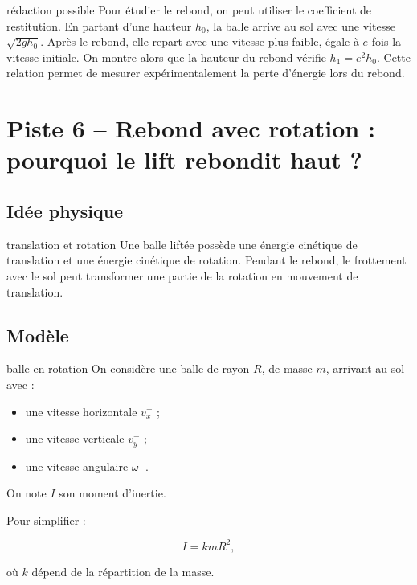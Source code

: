 \documentclass[11pt,a4paper]{article}
\begin{document}
\begin{oral}{rédaction possible}
Pour étudier le rebond, on peut utiliser le coefficient de restitution. En partant d'une hauteur $h_0$, la balle arrive au sol avec une vitesse $\sqrt{2gh_0}$. Après le rebond, elle repart avec une vitesse plus faible, égale à $e$ fois la vitesse initiale. On montre alors que la hauteur du rebond vérifie $h_1=e^2h_0$. Cette relation permet de mesurer expérimentalement la perte d'énergie lors du rebond.
\end{oral}

\section{Piste 6 -- Rebond avec rotation : pourquoi le lift rebondit haut ?}

\subsection{Idée physique}

\begin{idee}{translation et rotation}
Une balle liftée possède une énergie cinétique de translation et une énergie cinétique de rotation. Pendant le rebond, le frottement avec le sol peut transformer une partie de la rotation en mouvement de translation.
\end{idee}

\subsection{Modèle}

\begin{modele}{balle en rotation}
On considère une balle de rayon $R$, de masse $m$, arrivant au sol avec :
\begin{itemize}
    \item une vitesse horizontale $v_x^-$ ;
    \item une vitesse verticale $v_y^-$ ;
    \item une vitesse angulaire $\omega^-$.
\end{itemize}

On note $I$ son moment d'inertie.

Pour simplifier :

\[
I=k mR^2,
\]

où $k$ dépend de la répartition de la masse.
\end{modele}
\end{document}
